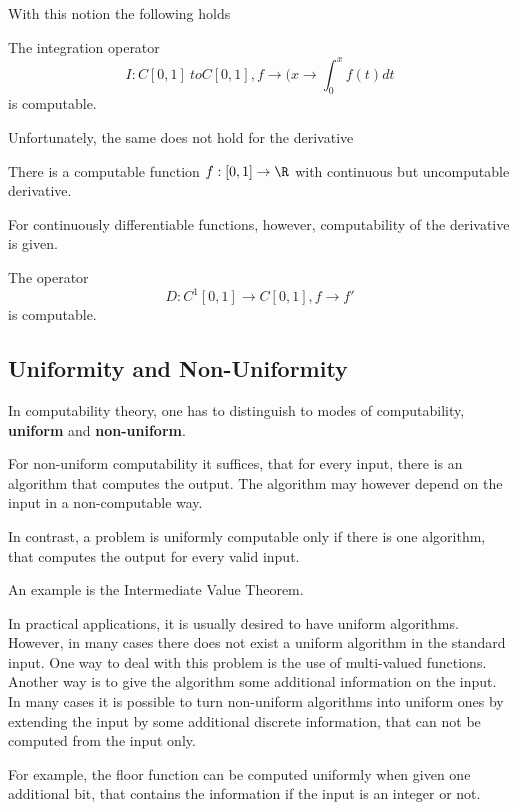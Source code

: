 With this notion the following holds
\begin{theorem}
The integration operator 
$$I: C[0,1] \ to C[0,1], f \to (x \to \int_0^x f(t) dt$$   
is computable.
\end{theorem}
Unfortunately, the same does not hold for the derivative
\begin{theorem}[Myhill 1971]
There is a computable function $f: [0,1] \to \R$ with continuous but uncomputable derivative. 
\end{theorem}
For continuously differentiable functions, however, computability of the
derivative is given. 
\begin{theorem}
The operator 
$$ D: C^1[0,1] \to C[0,1], f \to f'$$
is computable.
\end{theorem}
\subsection{Uniformity and Non-Uniformity}
In computability theory, one has to distinguish to modes of computability, \textbf{uniform} and \textbf{non-uniform}.

For non-uniform computability it suffices, that for every input, there is an algorithm that computes the output. 
The algorithm may however depend on the input in a non-computable way.

In contrast, a problem is uniformly computable only if there is one algorithm, that computes the output for every valid input. 

An example is the Intermediate Value Theorem.

In practical applications, it is usually desired to have uniform algorithms.
However, in many cases there does not exist a uniform algorithm in the standard
input.
One way to deal with this problem is the use of multi-valued functions.
Another way is to give the algorithm some additional information on the input.
In many cases it is possible to turn non-uniform algorithms into uniform ones
by extending the input by some additional discrete information, that can not be
computed from the input only.

For example, the floor function can be computed uniformly when given one
additional bit, that contains the information if the input is an integer or
not.  
